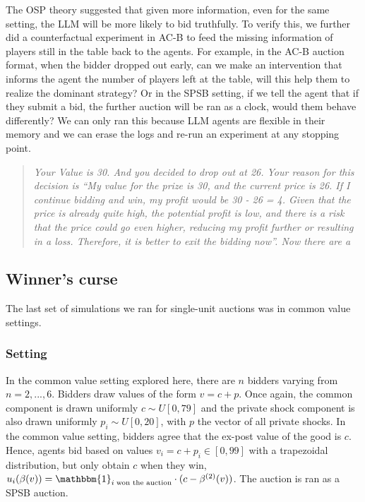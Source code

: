 \documentclass{article} %
\begin{document}
The OSP theory suggested that given more information, even for the same setting, the LLM will be more likely to bid truthfully.
To verify this, we further did a counterfactual experiment in AC-B to feed the missing information of players still in the table back to the agents. 
For example, in the AC-B auction format, when the bidder dropped out early, can we make an intervention that informs the agent the number of players left at the table, will this help them to realize the dominant strategy?
Or in the SPSB setting, if we tell the agent that if they submit a bid, the further auction will be ran as a clock, would them behave differently?
We can only ran this because LLM agents are flexible in their memory and we can erase the logs and re-run an experiment at any stopping point.


\begin{quote}
\textit{Your Value is 30. And you decided to drop out at 26. Your reason for this decision is “My value for the prize is 30, and the current price is 26. If I continue bidding and win, my profit would be 30 - 26 = 4. Given that the price is already quite high, the potential profit is low, and there is a risk that the price could go even higher, reducing my profit further or resulting in a loss. Therefore, it is better to exit the bidding now”. 
Now there are a}
\end{quote}







\subsection{Winner's curse}\label{session:winner}
The last set of simulations we ran for single-unit auctions was in common value settings. 

\subsubsection{Setting}
In the common value setting explored here, there are $n$ bidders varying from $n = 2, ..., 6$. 
Bidders draw values of the form $v = c + p$. Once again, the common component is drawn uniformly $c \sim U[0, 79]$ and the private shock component is also drawn uniformly $p_i \sim U[0, 20]$, with $p$ the vector of all private shocks. 
In the common value setting, bidders agree that the ex-post value of the good is $c$. 
Hence, agents bid based on values $v_i = c + p_i \in [0, 99]$ with a trapezoidal distribution, but only obtain $c$ when they win, $u_i(\beta(v)) = \mathbbm{1}_{i \; \text{won the auction}} \cdot (c - \beta^{(2)}(v))$. 
The auction is ran as a SPSB auction. 
\end{document}
